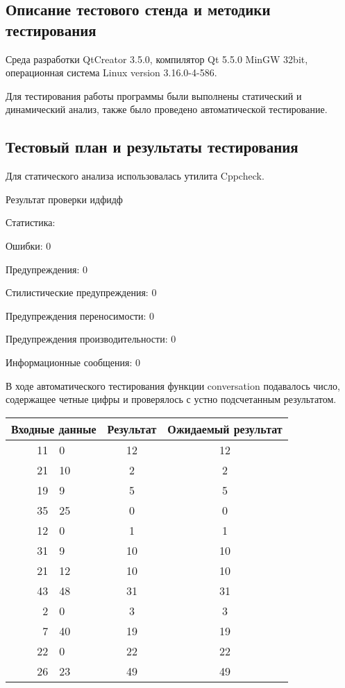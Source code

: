\documentclass[12pt,a4paper]{report}
\begin{document}
\subsection{Описание тестового стенда и методики тестирования}
Среда разработки QtCreator 3.5.0, компилятор Qt 5.5.0 MinGW 32bit, операционная система Linux version 3.16.0-4-586.

Для тестирования работы программы были выполнены статический и динамический анализ, также было проведено автоматической тестирование.

\subsection{Тестовый план и результаты тестирования}

		Для статического анализа использовалась утилита Cppcheck.
		
		\vspace{\baselineskip}
		Результат проверки идфидф
		
		Статистика:
		
		Ошибки:	0
		
		Предупреждения:	0
		
		Стилистические предупреждения:	0
		
		Предупреждения переносимости:	0
		
		Предупреждения производительности:	0
		
		Информационные сообщения:	0
		
		
		
В ходе автоматического тестирования функции conversation подавалось число, содержащее четные цифры и проверялось с устно подсчетанным результатом.

	\vspace{\baselineskip}

 \begin{tabular}{|r l|c|c|}
 	\hline 	
 	\multicolumn{2}{|c|}{Входные данные} & Результат & Ожидаемый  результат \\
 	\hline
 	11 & 0   &   12  &	12	\\       
 	21 & 10	&	2	&	2	\\
 	19 & 9	&	5	&	5	\\
 	35 & 25	&	0	&	0	\\
 	\hline
 	12 & 0   &   1  &	1	\\       
	31 & 9	&	10	&	10	\\
 	21 & 12	&	10	&	10	\\
 	43 & 48	&	31	&	31	\\
 	\hline
 	2 & 0   &   3  &	3	\\       
 	7 & 40	&	19	&	19	\\
 	22 & 0	&	22	&	22	\\
 	26 & 23	&	49	&	49	\\
 	\hline
 	
 \end{tabular}
\end{document}
